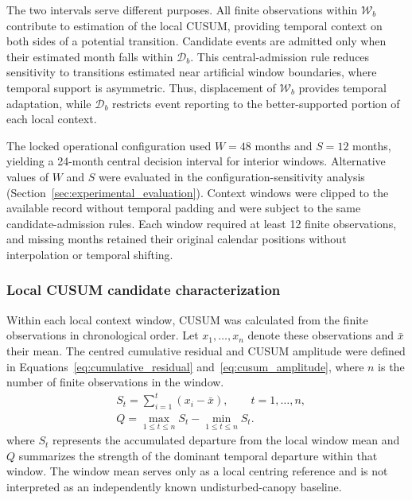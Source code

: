 The two intervals serve different purposes. All finite observations within $\mathcal{W}_b$ contribute to estimation of the local CUSUM, providing temporal context on both sides of a potential transition. Candidate events are admitted only when their estimated month falls within $\mathcal{D}_b$. This central-admission rule reduces sensitivity to transitions estimated near artificial window boundaries, where temporal support is asymmetric. Thus, displacement of $\mathcal{W}_b$ provides temporal adaptation, while $\mathcal{D}_b$ restricts event reporting to the better-supported portion of each local context.

The locked operational configuration used $W=48$ months and $S=12$ months, yielding a 24-month central decision interval for interior windows. Alternative values of $W$ and $S$ were evaluated in the configuration-sensitivity analysis (Section~\ref{sec:experimental_evaluation}). Context windows were clipped to the available record without temporal padding and were subject to the same candidate-admission rules. Each window required at least 12 finite observations, and missing months retained their original calendar positions without interpolation or temporal shifting.

\subsubsection{Local CUSUM candidate characterization}
\label{sec:windowed_cusum_candidate}

Within each local context window, CUSUM was calculated from the finite observations in chronological order. Let $x_1,\ldots,x_n$ denote these observations and $\bar{x}$ their mean. The centred cumulative residual and CUSUM amplitude were defined in Equations~\eqref{eq:cumulative_residual} and~\eqref{eq:cusum_amplitude}, where $n$ is the number of finite observations in the window.
\begin{align}
    &S_t
    =
    \sum_{i=1}^{t}(x_i-\bar{x}),
    \qquad t=1,\ldots,n,
    \label{eq:cumulative_residual}
    \\
    &Q
    =
    \max_{1\leq t\leq n} S_t
    -
    \min_{1\leq t\leq n} S_t .
    \label{eq:cusum_amplitude}
\end{align}
where $S_t$ represents the accumulated departure from the local window mean and $Q$ summarizes the strength of the dominant temporal departure within that window. The window mean serves only as a local centring reference and is not interpreted as an independently known undisturbed-canopy baseline.

